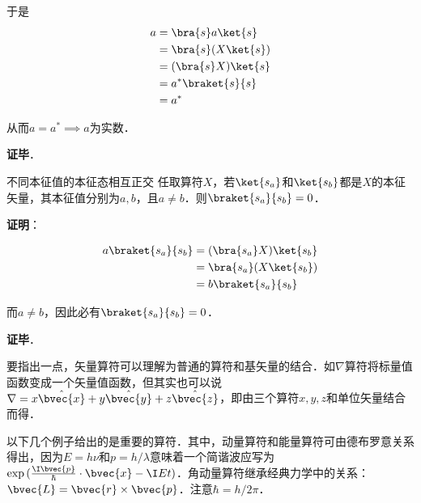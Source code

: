 于是
\begin{equation}
\begin{aligned}
a&=\bra{s}a\ket{s}\\
&=\bra{s}(X\ket{s})\\
&=(\bra{s}X)\ket{s}\\
&=a^*\braket{s}{s}\\
&=a^*
\end{aligned}
\end{equation}

从而$a=a^*\implies a$为实数．

\textbf{证毕}．


\begin{theorem}{不同本征值的本征态相互正交}\label{QMPrcp_the3}
任取算符$X$，若$\ket{s_a}$和$\ket{s_b}$都是$X$的本征矢量，其本征值分别为$a,b$，且$a\neq b$．则$\braket{s_a}{s_b}=0$．
\end{theorem}

\textbf{证明}：

\begin{equation}
\begin{aligned}
a\braket{s_a}{s_b}&=(\bra{s_a}X)\ket{s_b}\\
&=\bra{s_a}(X\ket{s_b})\\
&=b\braket{s_a}{s_b}
\end{aligned}
\end{equation}

而$a\neq b$，因此必有$\braket{s_a}{s_b}=0$．

\textbf{证毕}．







要指出一点，矢量算符可以理解为普通的算符和基矢量的结合．如$\nabla$算符将标量值函数变成一个矢量值函数，但其实也可以说$\nabla=x\hat{\bvec{x}}+y\hat{\bvec{y}}+z\hat{\bvec{z}}$，即由三个算符$x, y, z$和单位矢量结合而得．



以下几个例子给出的是重要的算符．其中，动量算符和能量算符可由德布罗意关系得出，因为$E=h\nu$和$p=h/\lambda$意味着一个简谐波应写为$\exp{(\frac{\I \bvec{p}}{\hbar}\cdot\bvec{x}-\I Et)}$．角动量算符继承经典力学中的关系：$\bvec{L}=\bvec{r}\times\bvec{p}$．注意$\hbar=h/2\pi$．

